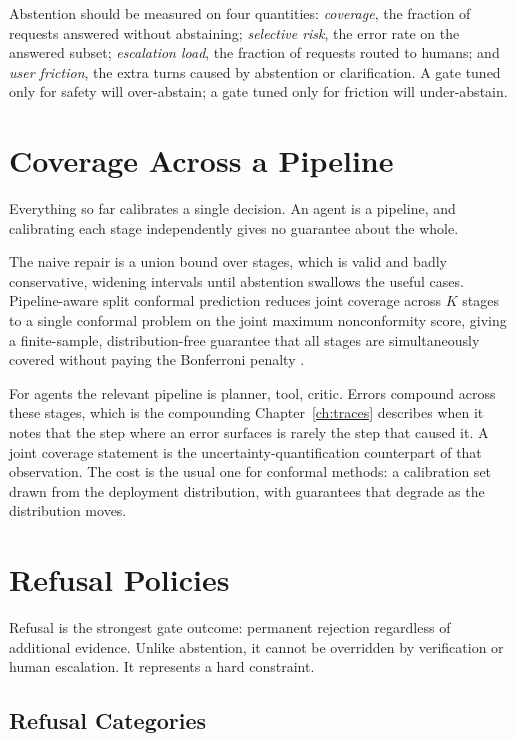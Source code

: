 \documentclass[11pt]{book}
\begin{document}
Abstention should be measured on four quantities: \textit{coverage}, the fraction of requests answered without abstaining; \textit{selective risk}, the error rate on the answered subset; \textit{escalation load}, the fraction of requests routed to humans; and \textit{user friction}, the extra turns caused by abstention or clarification. A gate tuned only for safety will over-abstain; a gate tuned only for friction will under-abstain.

\section{Coverage Across a Pipeline}

Everything so far calibrates a single decision. An agent is a pipeline, and calibrating each stage independently gives no guarantee about the whole.

The naive repair is a union bound over stages, which is valid and badly conservative, widening intervals until abstention swallows the useful cases. Pipeline-aware split conformal prediction reduces joint coverage across $K$ stages to a single conformal problem on the joint maximum nonconformity score, giving a finite-sample, distribution-free guarantee that all stages are simultaneously covered without paying the Bonferroni penalty \cite{pasc2026}.

For agents the relevant pipeline is planner, tool, critic. Errors compound across these stages, which is the compounding Chapter~\ref{ch:traces} describes when it notes that the step where an error surfaces is rarely the step that caused it. A joint coverage statement is the uncertainty-quantification counterpart of that observation. The cost is the usual one for conformal methods: a calibration set drawn from the deployment distribution, with guarantees that degrade as the distribution moves.

\section{Refusal Policies}

Refusal is the strongest gate outcome: permanent rejection regardless of additional evidence. Unlike abstention, it cannot be overridden by verification or human escalation. It represents a hard constraint.

\subsection{Refusal Categories}
\end{document}
